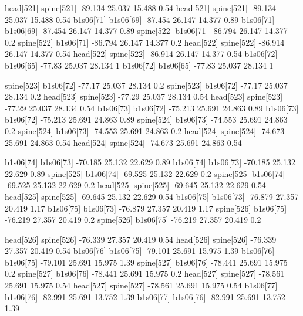 head[521]    spine[521]    -89.134    25.037    15.488    0.54
head[521]    spine[521]    -89.134    25.037    15.488    0.54
b1s06[71]    b1s06[69]    -87.454    26.147    14.377    0.89
b1s06[71]    b1s06[69]    -87.454    26.147    14.377    0.89
spine[522]    b1s06[71]    -86.794    26.147    14.377    0.2
spine[522]    b1s06[71]    -86.794    26.147    14.377    0.2
head[522]    spine[522]    -86.914    26.147    14.377    0.54
head[522]    spine[522]    -86.914    26.147    14.377    0.54
b1s06[72]    b1s06[65]    -77.83    25.037    28.134    1
b1s06[72]    b1s06[65]    -77.83    25.037    28.134    1


spine[523]    b1s06[72]    -77.17    25.037    28.134    0.2
spine[523]    b1s06[72]    -77.17    25.037    28.134    0.2
head[523]    spine[523]    -77.29    25.037    28.134    0.54
head[523]    spine[523]    -77.29    25.037    28.134    0.54
b1s06[73]    b1s06[72]    -75.213    25.691    24.863    0.89
b1s06[73]    b1s06[72]    -75.213    25.691    24.863    0.89
spine[524]    b1s06[73]    -74.553    25.691    24.863    0.2
spine[524]    b1s06[73]    -74.553    25.691    24.863    0.2
head[524]    spine[524]    -74.673    25.691    24.863    0.54
head[524]    spine[524]    -74.673    25.691    24.863    0.54


b1s06[74]    b1s06[73]    -70.185    25.132    22.629    0.89
b1s06[74]    b1s06[73]    -70.185    25.132    22.629    0.89
spine[525]    b1s06[74]    -69.525    25.132    22.629    0.2
spine[525]    b1s06[74]    -69.525    25.132    22.629    0.2
head[525]    spine[525]    -69.645    25.132    22.629    0.54
head[525]    spine[525]    -69.645    25.132    22.629    0.54
b1s06[75]    b1s06[73]    -76.879    27.357    20.419    1.17
b1s06[75]    b1s06[73]    -76.879    27.357    20.419    1.17
spine[526]    b1s06[75]    -76.219    27.357    20.419    0.2
spine[526]    b1s06[75]    -76.219    27.357    20.419    0.2


head[526]    spine[526]    -76.339    27.357    20.419    0.54
head[526]    spine[526]    -76.339    27.357    20.419    0.54
b1s06[76]    b1s06[75]    -79.101    25.691    15.975    1.39
b1s06[76]    b1s06[75]    -79.101    25.691    15.975    1.39
spine[527]    b1s06[76]    -78.441    25.691    15.975    0.2
spine[527]    b1s06[76]    -78.441    25.691    15.975    0.2
head[527]    spine[527]    -78.561    25.691    15.975    0.54
head[527]    spine[527]    -78.561    25.691    15.975    0.54
b1s06[77]    b1s06[76]    -82.991    25.691    13.752    1.39
b1s06[77]    b1s06[76]    -82.991    25.691    13.752    1.39


